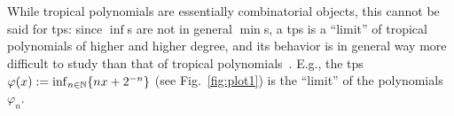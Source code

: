 While tropical polynomials are essentially combinatorial objects, this cannot be said for tps: since $\inf$s are not in general $\min$s, a tps is a ``limit'' of tropical polynomials of higher and higher degree, and its behavior is in general way more difficult to study than that of tropical polynomials~\cite{Porzio2021}. %
E.g., the tps $\varphi(x):=\inf_{n\in\mathbb{N}}\{nx+2^{-n}\}$ (see Fig.~\ref{fig:plot1}) %
is the ``limit'' of the polynomials $\varphi_{n}$.

%
%



